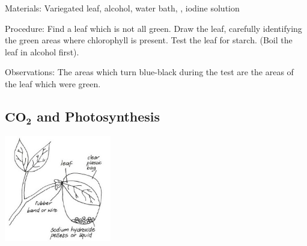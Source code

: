 \begin{multicols}{2}
\begin{description*}
\item[Materials:]{Variegated leaf, alcohol, water bath, , iodine solution}
\item[Procedure:]{Find a leaf which is not all green. Draw the
leaf, carefully identifying the
green areas where chlorophyll is
present. Test the leaf for starch.
(Boil the leaf in alcohol first).
}
\item[Observations:]{The areas which turn
blue-black during the test are the
areas of the leaf which were
green.}
\end{description*}

\subsection{$\mathrm{\textbf{C}\textbf{O}_\textbf{2}}$ and Photosynthesis}  %

\begin{center}
\includegraphics[width=0.35\textwidth]{./img/vso/co2-photo.jpg}
\end{center}


\end{multicols}
